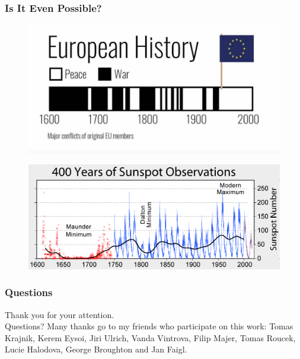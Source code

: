 \begin{frame}
	\frametitle{Is It Even Possible?}
    \vspace{3mm}
\begin{figure}[!b]
      \includegraphics[width=0.6\columnwidth]{fig/wars.jpg}
\end{figure}
\begin{figure}[!b]
    \hspace{5mm}
      \includegraphics[width=0.6\columnwidth]{fig/Sunspot_Numbers.png}
\end{figure}
\end{frame}


\begin{frame}
	\frametitle{Questions}
	\begin{center}
		\vfill
		Thank you for your attention.\\
		\vfill
		Questions?
		\vfill
		\vfill
		\vfill
Many thanks go to my friends who participate on this work: Tomas Krajnik, Kerem Eysoi, Jiri Ulrich, Vanda Vintrova, Filip Majer, Tomas Roucek, Lucie Halodova, George Broughton and Jan Faigl.
	\end{center}
\end{frame}



